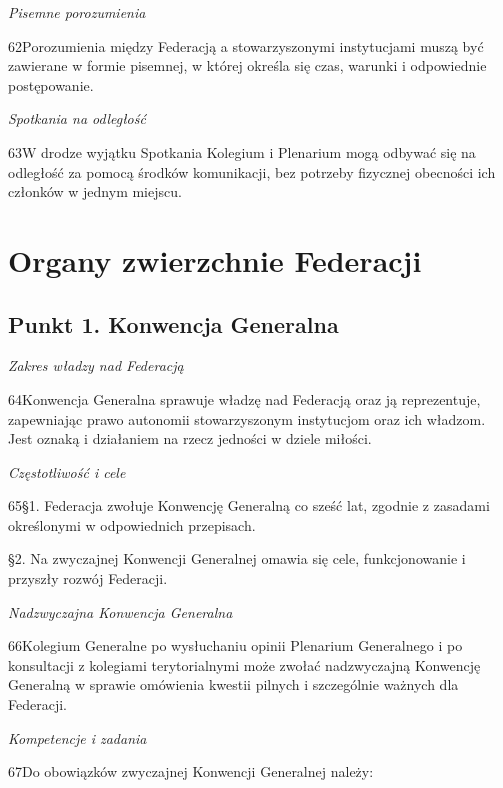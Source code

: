 ﻿\documentclass{book}
\newcommand{\lett}[1]{\lettrine[findent=6pt]{#1}}
\newcommand{\ssec}[1]{\vspace{1em}\textit{#1}\vspace{.5em}\nopagebreak}
\begin{document}
\ssec{Pisemne porozumienia}


\lett{62} Porozumienia między Federacją a stowarzyszonymi instytucjami muszą być zawierane w formie pisemnej, w której określa się czas, warunki i odpowiednie postępowanie.
 
\ssec{Spotkania na odległość}


\lett{63} W drodze wyjątku Spotkania Kolegium i Plenarium mogą odbywać się na odległość za pomocą środków komunikacji, bez potrzeby fizycznej obecności ich członków w jednym miejscu.
 
\chapter{Organy zwierzchnie Federacji}
 
\section{Punkt 1. Konwencja Generalna}


\ssec{Zakres władzy nad Federacją}


\lett{64} Konwencja Generalna sprawuje władzę nad Federacją oraz ją reprezentuje, zapewniając prawo autonomii stowarzyszonym instytucjom oraz ich władzom. Jest oznaką i działaniem na rzecz jedności w dziele miłości.
 
\ssec{Częstotliwość i cele}


\lett{65} \S{}1. Federacja zwołuje Konwencję Generalną co sześć lat, zgodnie z zasadami określonymi w odpowiednich przepisach.




\S{}2. Na zwyczajnej  Konwencji Generalnej omawia się cele, funkcjonowanie i przyszły rozwój Federacji.




\ssec{Nadzwyczajna Konwencja Generalna}


\lett{66} Kolegium Generalne po wysłuchaniu opinii Plenarium Generalnego i po konsultacji z kolegiami terytorialnymi może zwołać nadzwyczajną Konwencję Generalną w sprawie omówienia kwestii pilnych i szczególnie ważnych dla Federacji.


\ssec{Kompetencje i zadania}


\lett{67} Do obowiązków zwyczajnej Konwencji Generalnej należy:
\end{document}
